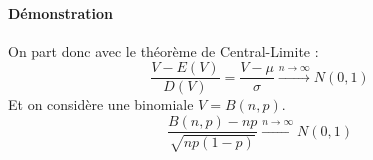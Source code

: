 \paragraph{Démonstration}
On part donc avec le théorème de Central-Limite :
$$\dfrac{V-E(V)}{D(V)} = \dfrac{V-\mu}{\sigma} \stackrel{n\rightarrow\infty}{\rightarrow} N(0,1)$$
Et on considère une binomiale $V = B(n,p)$.
$$\boxed{\dfrac{B(n,p)-np}{\sqrt{np(1-p)}} \stackrel{n\rightarrow\infty}{\rightarrow} N(0,1)}$$


